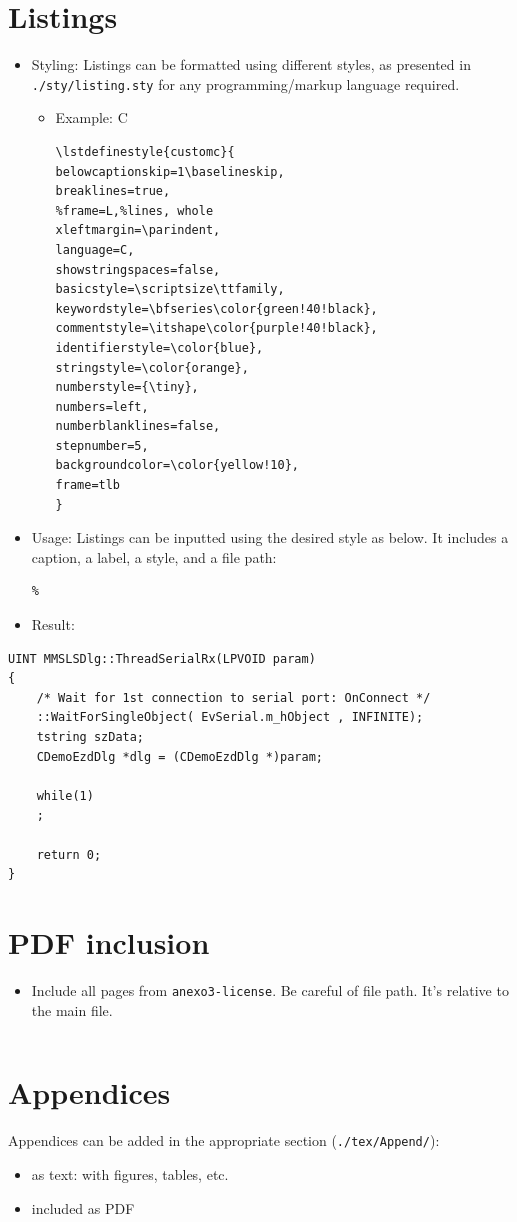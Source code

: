 \documentclass[11pt]{article}
\begin{document}
\section{Listings}
\label{sec:org52673a7}
\begin{itemize}
\item Styling: Listings can be formatted using different styles, as presented in
\texttt{./sty/listing.sty} for any programming/markup language required.
\begin{itemize}
\item Example: C
\lstset{language=[LaTeX]TeX,label= ,caption= ,captionpos=b,numbers=none}
\begin{lstlisting}
\lstdefinestyle{customc}{
belowcaptionskip=1\baselineskip,
breaklines=true,
%frame=L,%lines, whole
xleftmargin=\parindent,
language=C,
showstringspaces=false,
basicstyle=\scriptsize\ttfamily,
keywordstyle=\bfseries\color{green!40!black},
commentstyle=\itshape\color{purple!40!black},
identifierstyle=\color{blue},
stringstyle=\color{orange},
numberstyle={\tiny},
numbers=left,
numberblanklines=false,
stepnumber=5,
backgroundcolor=\color{yellow!10}, 
frame=tlb
}
\end{lstlisting}
\end{itemize}
\item Usage: Listings can be inputted using the desired style as below. It includes
a caption, a label, a style, and a file path:
\lstset{language=[LaTeX]TeX,label= ,caption= ,captionpos=b,numbers=none}
\begin{lstlisting}
%
\end{lstlisting}
\item Result:
\end{itemize}
\lstset{language=C,label= ,caption= ,captionpos=b,numbers=none,style=customc}
\begin{lstlisting}
UINT MMSLSDlg::ThreadSerialRx(LPVOID param)
{
    /* Wait for 1st connection to serial port: OnConnect */
    ::WaitForSingleObject( EvSerial.m_hObject , INFINITE); 
    tstring szData;
    CDemoEzdDlg *dlg = (CDemoEzdDlg *)param;

    while(1)
    ;

    return 0;
}
\end{lstlisting}
\section{PDF inclusion}
\label{sec:orgd6f8882}
\begin{itemize}
\item Include all pages from \texttt{anexo3-license}. Be careful of file path. It's
relative to the main file.
\lstset{language=[LaTeX]TeX,label= ,caption= ,captionpos=b,numbers=none}
\begin{lstlisting}

\end{lstlisting}
\end{itemize}
\section{Appendices}
\label{sec:org8624020}
Appendices can be added in the appropriate section (\texttt{./tex/Append/}):
\begin{itemize}
\item as text: with figures, tables, etc.
\item included as PDF
\end{itemize}
\end{document}
